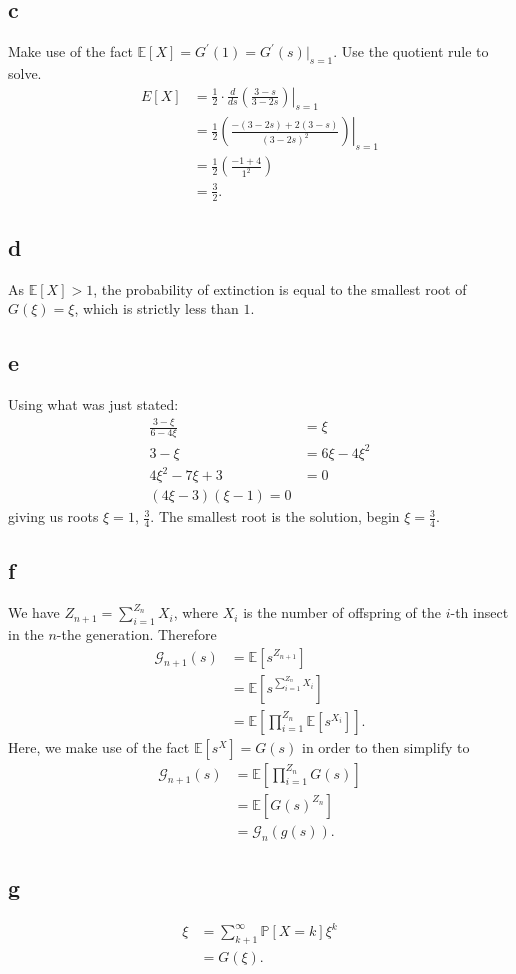 \documentclass{article}
\newcommand{\Prob}{\mathbb{P}}
\newcommand{\E}{\mathbb{E}}
\begin{document}
\subsection{c}
Make use of the fact $\E[X] = G^\prime(1) = G^\prime(s)\vert_{s=1}$. Use the quotient rule to solve.
\begin{align}
    E[X] &= \frac{1}{2}\cdot\frac{d}{ds}\left.\left( \frac{3-s}{3-2s} \right)\right\vert_{s=1} \\
    &= \frac{1}{2}\left.\left( \frac{-(3-2s)+2(3-s)}{(3-2s)^2} \right)\right\vert_{s=1} \\
    &= \frac{1}{2}\left( \frac{-1+4}{1^2} \right) \\
    &= \frac{3}{2}.
\end{align}

\subsection{d}
As $\E[X]>1$, the probability of extinction is equal to the smallest root of $G(\xi)=\xi$, which is strictly less than $1$.  

\subsection{e}
Using what was just stated:
\begin{align}
    \frac{3-\xi}{6-4\xi} &= \xi \\
    3-\xi &= 6\xi - 4\xi^2 \\
    4\xi^2 - 7\xi + 3 &= 0 \\
    (4\xi-3)(\xi-1) = 0
\end{align}
giving us roots $\xi=1,\,\frac{3}{4}$. The smallest root is the solution, begin $\xi = \frac{3}{4}$.

\subsection{f}
We have $Z_{n+1} = \sum_{i=1}^{Z_n}X_i$, where $X_i$ is the number of offspring of the $i$-th insect in the $n$-the generation. Therefore
\begin{align}
    \mathcal{G}_{n+1}(s) &= \E[s^{Z_{n+1}}] \\
    &= \E[s^{\sum_{i=1}^{Z_n}X_i}] \\
    &= \E[\prod_{i=1}^{Z_n}\E[s^{X_i}]].
\end{align}
Here, we make use of the fact $\E[s^X] = G(s)$ in order to then simplify to
\begin{align}
    \mathcal{G}_{n+1}(s) &= \E[\prod_{i=1}^{Z_n}G(s)]\\
    &= \E[G(s)^{Z_n}] \\
    &= \mathcal{G}_n(g(s)).
\end{align}

\subsection{g}
\begin{align}
    \xi &= \sum_{k+1}^\infty \Prob[X=k]\xi^k \\
    &= G(\xi).
\end{align}
\end{document}
